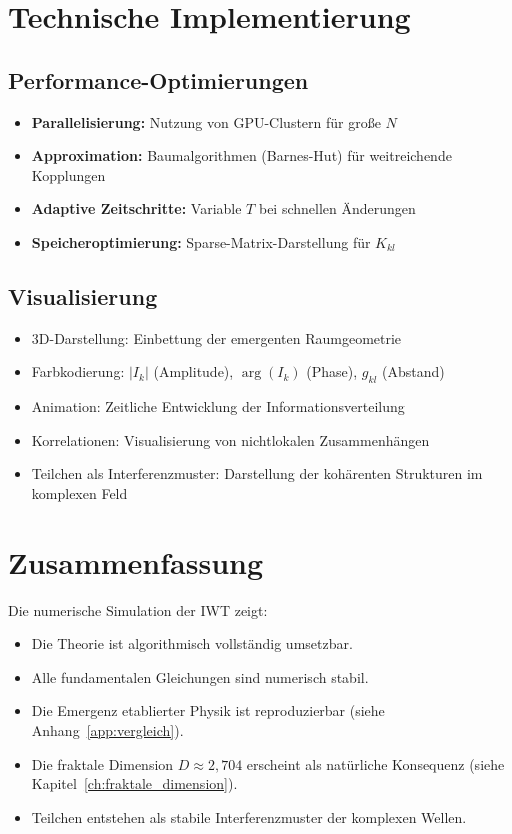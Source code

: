 \section{Technische Implementierung}
\label{app:numerik_technik}

\subsection{Performance-Optimierungen}
\label{sub:numerik_performance}

\begin{itemize}
    \item \textbf{Parallelisierung:} Nutzung von GPU-Clustern für große \( N \)
    \item \textbf{Approximation:} Baumalgorithmen (Barnes-Hut) für weitreichende Kopplungen
    \item \textbf{Adaptive Zeitschritte:} Variable \( T \) bei schnellen Änderungen
    \item \textbf{Speicheroptimierung:} Sparse-Matrix-Darstellung für \( K_{kl} \)
\end{itemize}

\subsection{Visualisierung}
\label{sub:numerik_visualisierung}

\begin{itemize}
    \item 3D-Darstellung: Einbettung der emergenten Raumgeometrie
    \item Farbkodierung: \( |I_k| \) (Amplitude), \( \arg(I_k) \) (Phase), \( g_{kl} \) (Abstand)
    \item Animation: Zeitliche Entwicklung der Informationsverteilung
    \item Korrelationen: Visualisierung von nichtlokalen Zusammenhängen
    \item Teilchen als Interferenzmuster: Darstellung der kohärenten Strukturen im komplexen Feld
\end{itemize}

\section{Zusammenfassung}
\label{app:numerik_zusammenfassung}

Die numerische Simulation der IWT zeigt:

\begin{itemize}
    \item Die Theorie ist algorithmisch vollständig umsetzbar.
    \item Alle fundamentalen Gleichungen sind numerisch stabil.
    \item Die Emergenz etablierter Physik ist reproduzierbar (siehe Anhang~\ref{app:vergleich}).
    \item Die fraktale Dimension \( D \approx 2,704 \) erscheint als natürliche Konsequenz (siehe Kapitel~\ref{ch:fraktale_dimension}).
    \item Teilchen entstehen als stabile Interferenzmuster der komplexen Wellen.
\end{itemize}

